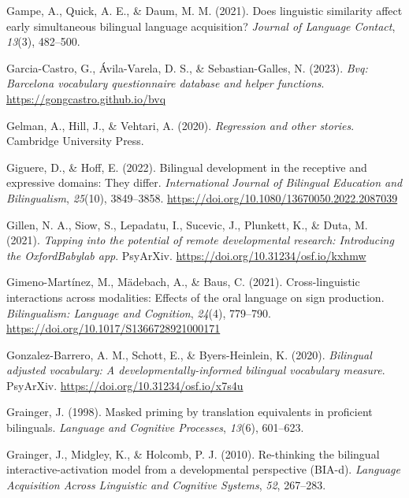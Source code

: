 \documentclass[
]{article}
\newlength{\cslhangindent}
\newlength{\cslentryspacingunit} %
\newenvironment{CSLReferences}[2] %
 {%
  \setlength{\parindent}{0pt}
  \ifodd #1
  \let\oldpar\par
  \def\par{\hangindent=\cslhangindent\oldpar}
  \fi
  \setlength{\parskip}{#2\cslentryspacingunit}
 }%
 {}
\begin{document}
\begin{CSLReferences}{1}{0}
\leavevmode{}%
Gampe, A., Quick, A. E., \& Daum, M. M. (2021). Does linguistic
similarity affect early simultaneous bilingual language acquisition?
\emph{Journal of Language Contact}, \emph{13}(3), 482--500.

\leavevmode{}%
Garcia-Castro, G., Ávila-Varela, D. S., \& Sebastian-Galles, N. (2023).
\emph{Bvq: Barcelona vocabulary questionnaire database and helper
functions}. \url{https://gongcastro.github.io/bvq}

\leavevmode{}%
Gelman, A., Hill, J., \& Vehtari, A. (2020). \emph{Regression and other
stories}. Cambridge University Press.

\leavevmode{}%
Giguere, D., \& Hoff, E. (2022). Bilingual development in the receptive
and expressive domains: They differ. \emph{International Journal of
Bilingual Education and Bilingualism}, \emph{25}(10), 3849--3858.
\url{https://doi.org/10.1080/13670050.2022.2087039}

\leavevmode{}%
Gillen, N. A., Siow, S., Lepadatu, I., Sucevic, J., Plunkett, K., \&
Duta, M. (2021). \emph{Tapping into the potential of remote
developmental research: Introducing the {OxfordBabylab} app}.
{PsyArXiv}. \url{https://doi.org/10.31234/osf.io/kxhmw}

\leavevmode{}%
Gimeno-Martínez, M., Mädebach, A., \& Baus, C. (2021). Cross-linguistic
interactions across modalities: Effects of the oral language on sign
production. \emph{Bilingualism: Language and Cognition}, \emph{24}(4),
779--790. \url{https://doi.org/10.1017/S1366728921000171}

\leavevmode{}%
Gonzalez-Barrero, A. M., Schott, E., \& Byers-Heinlein, K. (2020).
\emph{Bilingual adjusted vocabulary: A developmentally-informed
bilingual vocabulary measure}. {PsyArXiv}.
\url{https://doi.org/10.31234/osf.io/x7s4u}

\leavevmode{}%
Grainger, J. (1998). Masked priming by translation equivalents in
proficient bilinguals. \emph{Language and Cognitive Processes},
\emph{13}(6), 601--623.

\leavevmode{}%
Grainger, J., Midgley, K., \& Holcomb, P. J. (2010). Re-thinking the
bilingual interactive-activation model from a developmental perspective
(BIA-d). \emph{Language Acquisition Across Linguistic and Cognitive
Systems}, \emph{52}, 267--283.


\end{CSLReferences}
\end{document}

